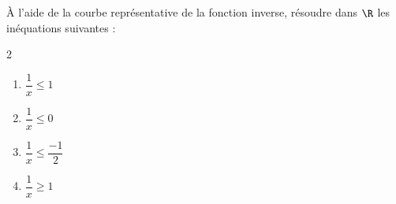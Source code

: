 \begin{exo}{}
	À l'aide de la courbe représentative de la fonction inverse, résoudre dans $\R$ les inéquations suivantes :
	\vspace*{-2mm}
	\begin{multicols}{2}
		\begin{enumerate}[itemsep=2mm]
			\item $\dfrac{1}{x} \le 1$
			\item $\dfrac{1}{x} \le 0$
			\item $\dfrac{1}{x} \le \dfrac{-1}{2}$
			\item $\dfrac{1}{x} \ge 1$
		\end{enumerate}
	\end{multicols}\vspace*{-2mm}
\end{exo}
